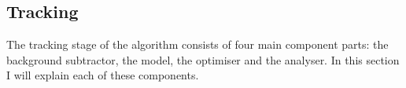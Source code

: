 \subsection{Tracking}
\label{sec:tracking}

The tracking stage of the algorithm consists of four main component parts: the background subtractor, the model, the optimiser and the analyser. In this section I will explain each of these components.







